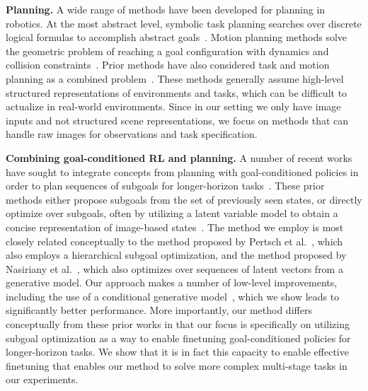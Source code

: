 \textbf{Planning.} A wide range of methods have been developed for planning in robotics. At the most abstract level, symbolic task planning searches over discrete logical formulas to accomplish abstract goals~\citep{fikes1971strips}. Motion planning methods solve the geometric problem of reaching a goal configuration with dynamics and collision constraints~\citep{Kavraki1996, koenig2002dstarlite,  karaman2011rrtstar, zucker2013chomp, kalakrishnan2011stomp}. Prior methods have also considered task and motion planning as a combined problem~\citep{srivastava14tamp}. These methods generally assume high-level structured representations of environments and tasks, which can be difficult to actualize in real-world environments. Since in our setting we only have image inputs and not structured scene representations, we focus on methods that can handle raw images for observations and task specification.

\textbf{Combining goal-conditioned RL and planning.}
A number of recent works have sought to integrate concepts from planning with goal-conditioned policies in order to plan sequences of subgoals for longer-horizon tasks~\citep{Nasiriany2019PlanningWG, Eysenbach2019SearchOT, fang2019cavin, Charlesworth2020PlanGANMP, Pertsch2020LongHorizonVP, Sharma2021AutonomousRL, Zhang2021CPlanningAA}. These prior methods either propose subgoals from the set of previously seen states, or directly optimize over subgoals, often by utilizing a latent variable model to obtain a concise representation of image-based states~\citep{nair2018rig,ichter2018learning,nair2019hierarchical,Nasiriany2019PlanningWG,Pertsch2020LongHorizonVP, Khazatsky2021WhatCI, ChaneSane2021GoalConditionedRL}. 
The method we employ is most closely related conceptually to the method proposed by Pertsch et al.~\citep{Pertsch2020LongHorizonVP}, which also employs a hierarchical subgoal optimization, and the method proposed by Nasiriany et al.~\citep{Nasiriany2019PlanningWG}, which also optimizes over sequences of latent vectors from a generative model. Our approach makes a number of low-level improvements, including the use of a conditional generative model~\citep{Nair2019ContextualIG}, which we show leads to significantly better performance. More importantly, our method differs conceptually from these prior works in that our focus is specifically on utilizing subgoal optimization as a way to enable finetuning goal-conditioned policies for longer-horizon tasks. We show that it is in fact this capacity to enable effective finetuning that enables our method to solve more complex multi-stage tasks in our experiments.

